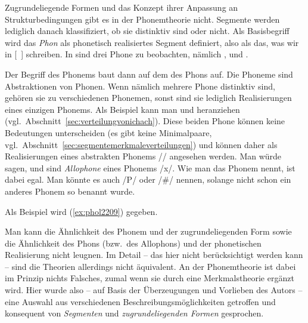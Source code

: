Zugrundeliegende Formen und das Konzept ihrer Anpassung an Strukturbedingungen gibt es in der Phonemtheorie nicht.
Segmente werden lediglich danach klassifiziert, ob sie distinktiv sind oder nicht.
Als Basisbegriff wird das \textit{Phon} als phonetisch realisiertes Segment definiert, also als das, was wir in [~] schreiben.
In \textipa{[ta:k]} sind drei Phone zu beobachten, nämlich \textipa{[t]}, \textipa{[a:]} und \textipa{[k]}.


Der Begriff des Phonems baut dann auf dem des Phons auf.
Die Phoneme sind Abstraktionen von Phonen.
Wenn nämlich mehrere Phone distinktiv sind, gehören sie zu verschiedenen Phonemen, sonst sind sie lediglich Realisierungen eines einzigen Phonems.
Als Beispiel kann man \textipa{[\c{c}]} und \textipa{[X]} heranziehen (vgl.\ Abschnitt~\ref{sec:verteilungvonichach}).
Diese beiden Phone können keine Bedeutungen unterscheiden (es gibt keine Minimalpaare, vgl.\ Abschnitt~\ref{sec:segmentemerkmaleverteilungen}) und können daher als Realisierungen eines abstrakten Phonems // angesehen werden.
Man würde sagen, \textipa{[\c{c}]} und \textipa{[X]} sind \textit{Allophone} eines Phonems /x/.
Wie man das Phonem nennt, ist dabei egal.
Man könnte es auch /P/ oder /\#/ nennen, solange nicht schon ein anderes Phonem so benannt wurde.


Als Beispiel wird (\ref{ex:phol2209}) gegeben.

\begin{exe}
  \ex\label{ex:phol2209}
  \begin{xlist}
  \end{xlist}
\end{exe}

Man kann die Ähnlichkeit des Phonem und der zugrundeliegenden Form sowie die Ähnlichkeit des Phons (bzw.\ des Allophons) und der phonetischen Realisierung nicht leugnen.
Im Detail -- das hier nicht berücksichtigt werden kann -- sind die Theorien allerdings nicht äquivalent.
An der Phonemtheorie ist dabei im Prinzip nichts Falsches, zumal wenn sie durch eine Merkmalstheorie ergänzt wird.
Hier wurde also -- auf Basis der Überzeugungen und Vorlieben des Autors -- eine Auswahl aus verschiedenen Beschreibungsmöglichkeiten getroffen und konsequent von \textit{Segmenten} und \textit{zugrundeliegenden Formen} gesprochen.

